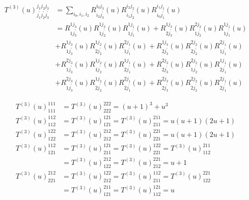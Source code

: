 \documentclass[12pt,a4paper]{ltjsarticle}
\begin{document}
\begin{enumerate}
      \begin{align}
        T^{(3)}(u)^{j_{1}j_{2}j_{3}}_{j_{1}^{\prime}j_{2}^{\prime}j_{3}^{\prime}}
        &= \sum_{i_{0},i_{1},i_{2}}
       R^{i_{0}j_{3}}_{i_{2}j_{3}^{\prime}}(u)
       R^{i_{2}j_{2}}_{i_{1}j_{2}^{\prime}}(u)
       R^{i_{1}j_{1}}_{i_{0}j_{1}^{\prime}}(u)\\
       &=
       R^{{1}j_{3}}_{{1}j_{3}^{\prime}}(u)
       R^{{1}j_{2}}_{{1}j_{2}^{\prime}}(u)
       R^{{1}j_{1}}_{{1}j_{1}^{\prime}}(u)
       +
       R^{{1}j_{3}}_{{2}j_{3}^{\prime}}(u)
       R^{{2}j_{2}}_{{1}j_{2}^{\prime}}(u)
       R^{{1}j_{1}}_{{1}j_{1}^{\prime}}(u)\\
       &+
       R^{{1}j_{3}}_{{1}j_{3}^{\prime}}(u)
       R^{{1}j_{2}}_{{2}j_{2}^{\prime}}(u)
       R^{{2}j_{1}}_{{1}j_{1}^{\prime}}(u)
       +
       R^{{1}j_{3}}_{{2}j_{3}^{\prime}}(u)
       R^{{2}j_{2}}_{{2}j_{2}^{\prime}}(u)
       R^{{2}j_{1}}_{{1}j_{1}^{\prime}}(u)\\
       &+
       R^{{2}j_{3}}_{{1}j_{3}^{\prime}}(u)
       R^{{1}j_{2}}_{{1}j_{2}^{\prime}}(u)
       R^{{1}j_{1}}_{{2}j_{1}^{\prime}}(u)
       +
       R^{{2}j_{3}}_{{2}j_{3}^{\prime}}(u)
       R^{{2}j_{2}}_{{1}j_{2}^{\prime}}(u)
       R^{{1}j_{1}}_{{2}j_{1}^{\prime}}(u)\\
       &+
       R^{{2}j_{3}}_{{1}j_{3}^{\prime}}(u)
       R^{{1}j_{2}}_{{2}j_{2}^{\prime}}(u)
       R^{{2}j_{1}}_{{2}j_{1}^{\prime}}(u)
       +
       R^{{2}j_{3}}_{{2}j_{3}^{\prime}}(u)
       R^{{2}j_{2}}_{{2}j_{2}^{\prime}}(u)
       R^{{2}j_{1}}_{{2}j_{1}^{\prime}}(u)
      \end{align}



      \begin{align}
       T^{(3)}(u)^{{1}{1}{1}}_{{1}{1}{1}}
       &= T^{(3)}(u)^{{2}{2}{2}}_{{2}{2}{2}} = (u+1)^{3} + u^{3}\\
       T^{(3)}(u)^{{1}{1}{2}}_{{1}{1}{2}}
       &= T^{(3)}(u)^{{1}{2}{1}}_{{1}{2}{1}}
       = T^{(3)}(u)^{{2}{1}{1}}_{{2}{1}{1}}
       = u(u+1)(2u+1)\\
       T^{(3)}(u)^{{1}{2}{2}}_{{1}{2}{2}}
       &= T^{(3)}(u)^{{2}{1}{2}}_{{2}{1}{2}}
       = T^{(3)}(u)^{{2}{2}{1}}_{{2}{2}{1}}
       = u(u+1)(2u+1)\\
       T^{(3)}(u)^{{1}{1}{2}}_{{1}{2}{1}}
       &= T^{(3)}(u)^{{1}{2}{1}}_{{2}{1}{1}}
       = T^{(3)}(u)^{{1}{2}{2}}_{{2}{2}{1}}
       = T^{(3)}(u)^{{2}{1}{1}}_{{1}{1}{2}}\\
       &= T^{(3)}(u)^{{2}{1}{2}}_{{1}{2}{2}}
       = T^{(3)}(u)^{{2}{2}{1}}_{{2}{1}{2}}
       = u+1\\
       T^{(3)}(u)^{{2}{1}{2}}_{{2}{2}{1}}
       &= T^{(3)}(u)^{{1}{2}{2}}_{{2}{1}{2}}
       = T^{(3)}(u)^{{1}{1}{2}}_{{2}{1}{1}}
       = T^{(3)}(u)^{{2}{2}{1}}_{{1}{2}{2}}\\
       &= T^{(3)}(u)^{{2}{1}{1}}_{{1}{2}{1}}
       = T^{(3)}(u)^{{1}{2}{1}}_{{1}{1}{2}}
       = u
      \end{align}





\end{enumerate}
\end{document}
